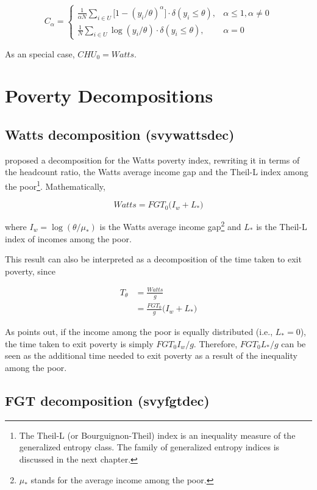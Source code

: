 \documentclass[]{book}
\let\rmarkdownfootnote\footnote%
\def\footnote{\protect\rmarkdownfootnote}
\begin{document}
\[
C_\alpha = \begin{cases}
    \frac{1}{\alpha N} \sum_{i \in U} \big[ 1-(y_i/\theta)^\alpha \big] \cdot \delta ( y_i \leqslant \theta ) , & \alpha \leqslant 1 , \alpha \neq 0 \\
    \frac{1}{N} \sum_{i \in U} \log (y_i/\theta) \cdot \delta ( y_i \leqslant \theta ) , &  \alpha = 0
\end{cases}
\]

As an special case, \(CHU_0 = Watts\).

\section{Poverty Decompositions}\label{poverty-decompositions}

\subsection{Watts decomposition
(svywattsdec)}\label{watts-decomposition-svywattsdec}

\citet{chakravarty2008} proposed a decomposition for the Watts poverty
index, rewriting it in terms of the headcount ratio, the Watts average
income gap and the Theil-L index among the poor\footnote{The Theil-L (or
  Bourguignon-Theil) index is an inequality measure of the generalized
  entropy class. The family of generalized entropy indices is discussed
  in the next chapter.}. Mathematically,

\[
Watts = FGT_0 \big( I_w + L_* \big)
\]

where \(I_w = \log(\theta/\mu_*)\) is the Watts average income
gap\footnote{\(\mu_*\) stands for the average income among the poor.}
and \(L_*\) is the Theil-L index of incomes among the poor.

This result can also be interpreted as a decomposition of the time taken
to exit poverty, since

\[
\begin{aligned}
T_\theta &= \frac{Watts}{g} \\ 
&= \frac{FGT_0}{g} \big( I_w + L_* \big)
\end{aligned}
\]

As \citet{murdoch1998} points out, if the income among the poor is
equally distributed (i.e., \(L_*=0\)), the time taken to exit poverty is
simply \(FGT_0 I_w / g\). Therefore, \(FGT_0 L_* / g\) can be seen as
the additional time needed to exit poverty as a result of the inequality
among the poor.

\subsection{FGT decomposition
(svyfgtdec)}\label{fgt-decomposition-svyfgtdec}
\end{document}
